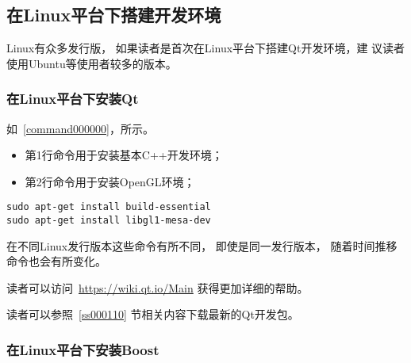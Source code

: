 ﻿%




%


\subsection{
在Linux平台下搭建开发环境
}\label{s000210}


Linux有众多发行版，
如果读者是首次在Linux平台下搭建Qt开发环境，建
议读者使用Ubuntu等使用者较多的版本。


\subsubsection{
在Linux平台下安装Qt
}\label{ss000410}



如\commandnumbernameone\ \ref{command000000}，所示。

\begin{itemize}
\item 第1行命令用于安装基本C{\sourcefonttwo{}+}{\sourcefonttwo{}+}开发环境；
\item 第2行命令用于安装OpenGL环境；
\end{itemize}



\label{command000000}    %
\begin{lstlisting}[caption=GoodLuck,
title=\commandnumbernameone \thecommandnumber
]
sudo apt-get install build-essential
sudo apt-get install libgl1-mesa-dev
\end{lstlisting}          %



在不同Linux发行版本这些命令有所不同，
即使是同一发行版本，
随着时间推移命令也会有所变化。

读者可以访问\ \url{https://wiki.qt.io/Main}
获得更加详细的帮助。

读者可以参照\ \ref{ss000110}
节相关内容下载最新的Qt开发包。





\subsubsection{
在Linux平台下安装Boost
}\label{ss000510}















